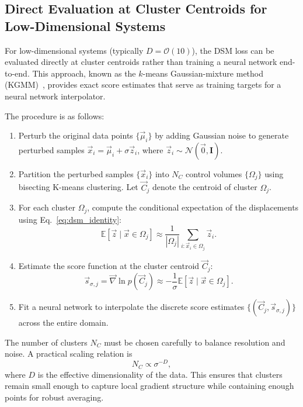 \documentclass[%
  prl,
  reprint,
  amsmath,
  amssymb,
  aps
]{revtex4-2}
\newcommand{\vvec}[1]{\vec{#1}}
\begin{document}
\subsection{Direct Evaluation at Cluster Centroids for Low-Dimensional Systems}

For low-dimensional systems (typically $D = \mathcal{O}(10)$), the DSM loss can be evaluated directly at cluster centroids rather than training a neural network end-to-end. This approach, known as the $k$-means Gaussian-mixture method (KGMM)~\cite{giorgini2025kgmm}, provides exact score estimates that serve as training targets for a neural network interpolator.

The procedure is as follows:
\begin{enumerate}
    \item Perturb the original data points $\{\vvec{\mu}_i\}$ by adding Gaussian noise to generate perturbed samples $\vvec{x}_i = \vvec{\mu}_i + \sigma \vvec{z}_i$, where $\vvec{z}_i \sim \mathcal{N}(\vvec{0}, \bm{I})$.
    \item Partition the perturbed samples $\{\vvec{x}_i\}$ into $N_C$ control volumes $\{\Omega_j\}$ using bisecting K-means clustering. Let $\vvec{C}_j$ denote the centroid of cluster $\Omega_j$.
    \item For each cluster $\Omega_j$, compute the conditional expectation of the displacements using Eq.~\eqref{eq:dsm_identity}:
    \begin{equation}
    \mathbb{E}[\vvec{z} \mid \vvec{x} \in \Omega_j] \approx \frac{1}{|\Omega_j|} \sum_{i: \vvec{x}_i \in \Omega_j} \vvec{z}_i.
    \end{equation}
    \item Estimate the score function at the cluster centroid $\vvec{C}_j$:
    \begin{equation}
    \vvec{s}_{\sigma,j}=\vvec{\nabla} \ln p(\vvec{C}_j) \approx -\frac{1}{\sigma} \mathbb{E}[\vvec{z} \mid \vvec{x} \in \Omega_j].
    \end{equation}
    \item Fit a neural network to interpolate the discrete score estimates $\{(\vvec{C}_j, \vvec{s}_{\sigma,j})\}$ across the entire domain.
\end{enumerate}

The number of clusters $N_C$ must be chosen carefully to balance resolution and noise. A practical scaling relation is
\begin{equation}
N_C \propto \sigma^{-D},
\end{equation}
where $D$ is the effective dimensionality of the data. This ensures that clusters remain small enough to capture local gradient structure while containing enough points for robust averaging.
\end{document}

